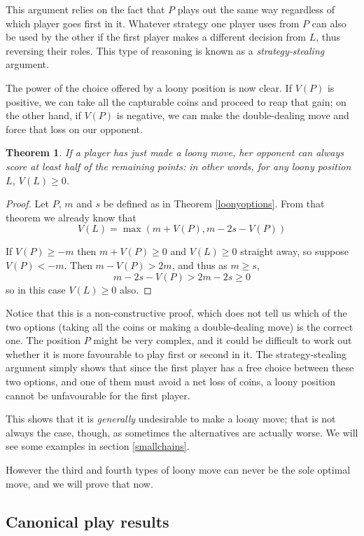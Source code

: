 \documentclass[a4paper,twocolumn]{article}
\newtheorem{loonynonneg}[thm]{Theorem}
\begin{document}
This argument relies on the fact that $P$ plays out the same way
regardless of which player goes first in it. Whatever strategy one
player uses from $P$ can also be used by the other if the first player
makes a different decision from $L$, thus reversing their roles. This
type of reasoning is known as a \emph{strategy-stealing} argument.

The power of the choice offered by a loony position is now clear. If
$V(P)$ is positive, we can take all the capturable coins and proceed
to reap that gain; on the other hand, if $V(P)$ is negative, we can
make the double-dealing move and force that loss on our opponent.

\begin{loonynonneg}\label{loonynonneg}
  If a player has just made a loony move, her opponent can always
  score at least half of the remaining points: in other words, for any
  loony position $L$, $V(L) \ge 0$.
\end{loonynonneg}

\begin{proof}
  Let $P$, $m$ and $s$ be defined as in Theorem
  \ref{loonyoptions}. From that theorem we already know that $$V(L) =
  \max(m+V(P), m-2s-V(P))$$

  If $V(P) \ge -m$ then $m+V(P) \ge 0$ and $V(L) \ge 0$ straight away,
  so suppose $V(P) < -m$. Then $m-V(P) > 2m$, and thus as $m \ge
  s$, $$m-2s-V(P) > 2m-2s \ge 0$$ so in this case $V(L) \ge 0$ also.
\end{proof}

Notice that this is a non-constructive proof, which does not tell us
which of the two options (taking all the coins or making a
double-dealing move) is the correct one. The position $P$ might be
very complex, and it could be difficult to work out whether it is more
favourable to play first or second in it. The strategy-stealing
argument simply shows that since the first player has a free choice
between these two options, and one of them must avoid a net loss of
coins, a loony position cannot be unfavourable for the first player.

This shows that it is \emph{generally} undesirable to make a loony
move; that is not always the case, though, as sometimes the
alternatives are actually worse. We will see some examples in section
\ref{smallchains}.

However the third and fourth types of loony move can never be the sole
optimal move, and we will prove that now.

\subsection{Canonical play results}
\end{document}
